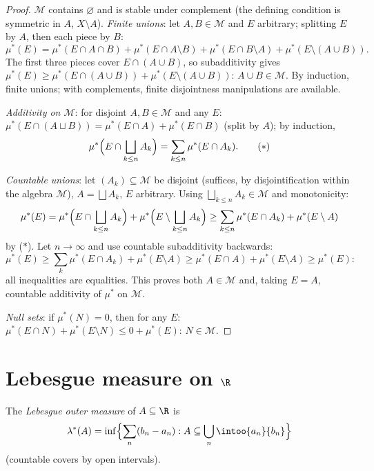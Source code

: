 \begin{proof}
$\mathcal M$ contains $\varnothing$ and is stable under
complement (the defining condition is symmetric in $A$,
$X\setminus A$). \emph{Finite unions}: let $A, B \in \mathcal
M$ and $E$ arbitrary; splitting $E$ by $A$, then each piece by
$B$:
\[
\mu^*(E) = \mu^*(E\cap A\cap B) + \mu^*(E\cap A\setminus B) +
\mu^*(E\cap B\setminus A) + \mu^*(E\setminus(A\cup B)).
\]
The first three pieces cover $E \cap (A \cup B)$, so
subadditivity gives $\mu^*(E) \geq \mu^*(E\cap(A\cup B)) +
\mu^*(E\setminus(A\cup B))$: $A \cup B \in \mathcal M$. By
induction, finite unions; with complements, finite disjointness
manipulations are available.

\emph{Additivity on $\mathcal M$}: for disjoint $A, B \in
\mathcal M$ and any $E$: $\mu^*(E\cap(A\sqcup B)) = \mu^*(E\cap
A) + \mu^*(E \cap B)$ (split by $A$); by induction,
\[
\mu^*\Bigl(E \cap \bigsqcup_{k\leq n}A_k\Bigr)
= \sum_{k\leq n}\mu^*(E\cap A_k).
\tag{$*$}
\]

\emph{Countable unions}: let $(A_k) \subseteq \mathcal M$ be
disjoint (suffices, by disjointification within the algebra
$\mathcal M$), $A = \bigsqcup A_k$, $E$ arbitrary. Using
$\bigsqcup_{k\leq n}A_k \in \mathcal M$ and monotonicity:
\[
\mu^*(E) = \mu^*\Bigl(E\cap\bigsqcup_{k\leq n}A_k\Bigr) +
\mu^*\Bigl(E\setminus\bigsqcup_{k\leq n}A_k\Bigr)
\geq \sum_{k \leq n}\mu^*(E\cap A_k) + \mu^*(E\setminus A)
\]
by ($*$). Let $n \to \infty$ and use countable subadditivity
backwards:
\[
\mu^*(E) \geq \sum_{k}\mu^*(E\cap A_k) + \mu^*(E\setminus A)
\geq \mu^*(E \cap A) + \mu^*(E\setminus A) \geq \mu^*(E):
\]
all inequalities are equalities. This proves both $A \in
\mathcal M$ and, taking $E = A$, countable additivity of
$\mu^*$ on $\mathcal M$.

\emph{Null sets}: if $\mu^*(N) = 0$, then for any $E$:
$\mu^*(E \cap N) + \mu^*(E\setminus N) \leq 0 + \mu^*(E)$:
$N \in \mathcal M$.
\end{proof}

\section{Lebesgue measure on \texorpdfstring{$\R$}{R}}

\begin{definition}\label{def:b3:measure:lebesgueouter}
The \emph{Lebesgue outer measure} of $A
\subseteq \R$ is
\[
\lambda^*(A) = \inf\Bigl\{\sum_{n} (b_n - a_n) :
A \subseteq \bigcup_n \intoo{a_n}{b_n}\Bigr\}
\]
(countable covers by open intervals).
\end{definition}

